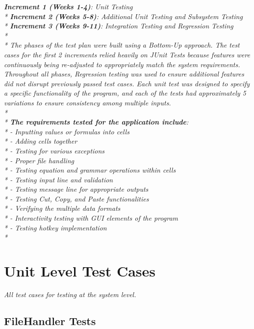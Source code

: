 \documentclass[12pt]{article}
\begin{document}
{\it
\textbf{Increment 1 (Weeks 1-4)}: Unit Testing \\*
\textbf{Increment 2 (Weeks 5-8)}: Additional Unit Testing and Subsystem Testing \\*
\textbf{Increment 3 (Weeks 9-11)}: Integration Testing and Regression Testing  \\*
\\*
The phases of the test plan were built using a Bottom-Up approach. The test cases for the first 2 increments relied heavily on JUnit Tests because features were continuously being re-adjusted to appropriately match the system requirements. Throughout all phases, Regression testing was used to ensure additional features did not disrupt previously passed test cases. Each unit test was designed to specify a specific functionality of the program, and each of the tests had approximately 5 variations to ensure consistency among multiple inputs. 
\\*
\\*
\textbf{The requirements tested for the application include}:\\*
- Inputting values or formulas into cells \\*
- Adding cells together \\*
- Testing for various exceptions \\*
- Proper file handling \\*
- Testing equation and grammar operations within cells \\*
- Testing input line and validation \\*
- Testing message line for appropriate outputs \\*
- Testing Cut, Copy, and Paste functionalities \\*
- Verifying the multiple data formats \\*
- Interactivity testing with GUI elements of the program \\*
- Testing hotkey implementation \\*

}
\section{Unit Level Test Cases}

{\it
All test cases for testing at the system level.
}
\subsection{FileHandler Tests}
\end{document}
